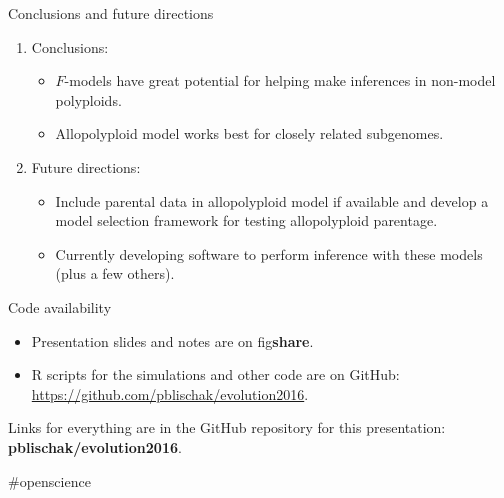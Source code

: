 \documentclass[presentation,sansserif,12pt]{beamer}
\begin{document}
\begin{frame}[t]{Conclusions and future directions}
	\pause
	\begin{enumerate}
		\item{Conclusions:}
		\vspace{0.1in}
		\setlength\itemsep{0.2in}
		\begin{itemize}
			\setlength\itemsep{0.2in}
			\item $F$-models have great potential for helping make inferences in non-model polyploids.
			\item Allopolyploid model works best for closely related subgenomes.
		\end{itemize}
		\pause
		\item{Future directions:}
		\vspace{0.1in}
		\setlength\itemsep{0.2in}
		\begin{itemize}
		\setlength\itemsep{0.2in}
			\item Include parental data in allopolyploid model if available and develop a model selection framework for testing allopolyploid parentage. \pause
			\item Currently developing software to perform inference with these models (plus a few others).
		\end{itemize}
	\end{enumerate}

\end{frame}

\begin{frame}[c]{Code availability}

	\begin{itemize}
	\setlength\itemsep{0.3in}

		\item Presentation slides and notes are on fig\textbf{share}.
		
		\item R scripts for the simulations and other code are on GitHub:\\[0.05in]\url{https://github.com/pblischak/evolution2016}.
		
		
	\end{itemize}
	\vspace{0.3in}

	{\large \alert{Links for everything are in the GitHub repository for this presentation: \textbf{pblischak/evolution2016}.}}
	\vspace{0.2in}

	\hfill {\tiny \#openscience}
\end{frame}
\end{document}

